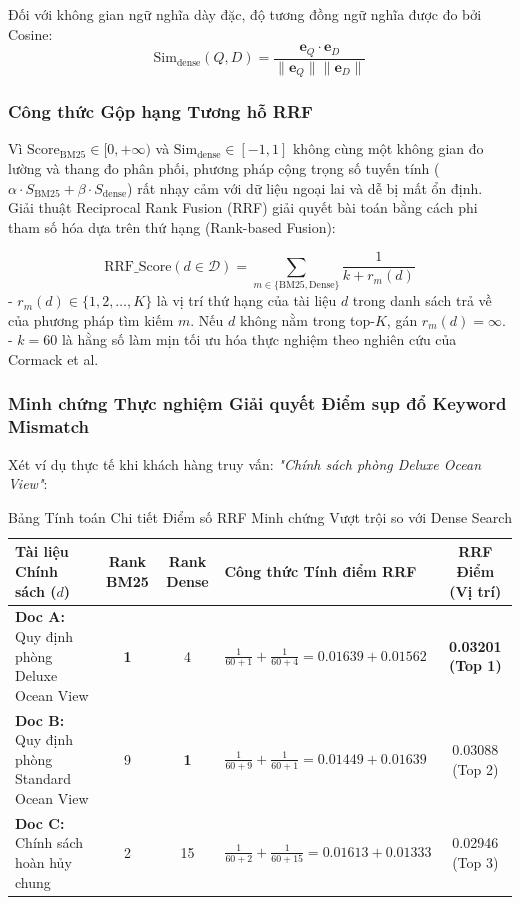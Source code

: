Đối với không gian ngữ nghĩa dày đặc, độ tương đồng ngữ nghĩa được đo bởi Cosine:
\begin{equation}
\text{Sim}_{\text{dense}}(Q, D) = \frac{\mathbf{e}_Q \cdot \mathbf{e}_D}{\|\mathbf{e}_Q\| \|\mathbf{e}_D\|}
\end{equation}

\subsubsection{Công thức Gộp hạng Tương hỗ RRF}
Vì $\text{Score}_{\text{BM25}} \in [0, +\infty)$ và $\text{Sim}_{\text{dense}} \in [-1, 1]$ không cùng một không gian đo lường và thang đo phân phối, phương pháp cộng trọng số tuyến tính ($\alpha \cdot S_{\text{BM25}} + \beta \cdot S_{\text{dense}}$) rất nhạy cảm với dữ liệu ngoại lai và dễ bị mất ổn định. Giải thuật Reciprocal Rank Fusion (RRF) giải quyết bài toán bằng cách phi tham số hóa dựa trên thứ hạng (Rank-based Fusion):

\begin{equation}
\text{RRF\_Score}(d \in \mathcal{D}) = \sum_{m \in \{\text{BM25}, \text{Dense}\}} \frac{1}{k + r_m(d)}
\end{equation}
- $r_m(d) \in \{1, 2, \dots, K\}$ là vị trí thứ hạng của tài liệu $d$ trong danh sách trả về của phương pháp tìm kiếm $m$. Nếu $d$ không nằm trong top-$K$, gán $r_m(d) = \infty$. \\
- $k = 60$ là hằng số làm mịn tối ưu hóa thực nghiệm theo nghiên cứu của Cormack et al.

\subsubsection{Minh chứng Thực nghiệm Giải quyết Điểm sụp đổ Keyword Mismatch}
Xét ví dụ thực tế khi khách hàng truy vấn: \textit{"Chính sách phòng Deluxe Ocean View"}:

\begin{table}[h!]
\centering
\small
\begin{tabular}{|p{4.2cm}|c|c|p{4.5cm}|c|}
\hline
\textbf{Tài liệu Chính sách ($d$)} & \textbf{Rank BM25} & \textbf{Rank Dense} & \textbf{Công thức Tính điểm RRF} & \textbf{RRF Điểm (Vị trí)} \\
\hline
\textbf{Doc A:} Quy định phòng Deluxe Ocean View & \textbf{1} & 4 & $\frac{1}{60 + 1} + \frac{1}{60 + 4} = 0.01639 + 0.01562$ & \textbf{0.03201 (Top 1)} \\
\hline
\textbf{Doc B:} Quy định phòng Standard Ocean View & 9 & \textbf{1} & $\frac{1}{60 + 9} + \frac{1}{60 + 1} = 0.01449 + 0.01639$ & 0.03088 (Top 2) \\
\hline
\textbf{Doc C:} Chính sách hoàn hủy chung & 2 & 15 & $\frac{1}{60 + 2} + \frac{1}{60 + 15} = 0.01613 + 0.01333$ & 0.02946 (Top 3) \\
\hline
\end{tabular}
\caption{Bảng Tính toán Chi tiết Điểm số RRF Minh chứng Vượt trội so với Dense Search}
\label{tab:rrf_numerical_example}
\end{table}

